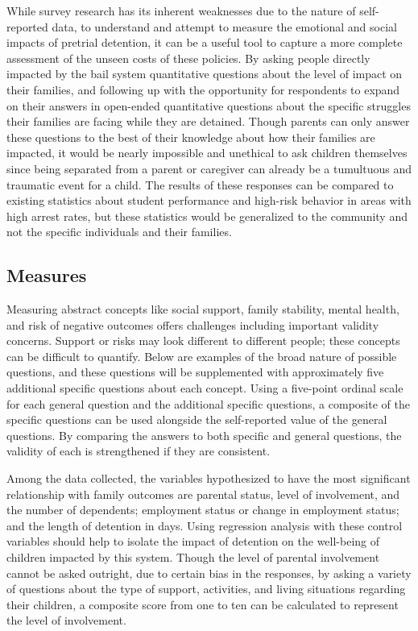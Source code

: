 \documentclass[
  letterpaper,
  DIV=11,
  numbers=noendperiod]{scrartcl}
\begin{document}
While survey research has its inherent weaknesses due to the nature of
self-reported data, to understand and attempt to measure the emotional
and social impacts of pretrial detention, it can be a useful tool to
capture a more complete assessment of the unseen costs of these
policies. By asking people directly impacted by the bail system
quantitative questions about the level of impact on their families, and
following up with the opportunity for respondents to expand on their
answers in open-ended quantitative questions about the specific
struggles their families are facing while they are detained. Though
parents can only answer these questions to the best of their knowledge
about how their families are impacted, it would be nearly impossible and
unethical to ask children themselves since being separated from a parent
or caregiver can already be a tumultuous and traumatic event for a
child. The results of these responses can be compared to existing
statistics about student performance and high-risk behavior in areas
with high arrest rates, but these statistics would be generalized to the
community and not the specific individuals and their families.

\hypertarget{measures}{%
\subsection{Measures}\label{measures}}

Measuring abstract concepts like social support, family stability,
mental health, and risk of negative outcomes offers challenges including
important validity concerns. Support or risks may look different to
different people; these concepts can be difficult to quantify. Below are
examples of the broad nature of possible questions, and these questions
will be supplemented with approximately five additional specific
questions about each concept. Using a five-point ordinal scale for each
general question and the additional specific questions, a composite of
the specific questions can be used alongside the self-reported value of
the general questions. By comparing the answers to both specific and
general questions, the validity of each is strengthened if they are
consistent.

Among the data collected, the variables hypothesized to have the most
significant relationship with family outcomes are parental status, level
of involvement, and the number of dependents; employment status or
change in employment status; and the length of detention in days. Using
regression analysis with these control variables should help to isolate
the impact of detention on the well-being of children impacted by this
system. Though the level of parental involvement cannot be asked
outright, due to certain bias in the responses, by asking a variety of
questions about the type of support, activities, and living situations
regarding their children, a composite score from one to ten can be
calculated to represent the level of involvement.
\end{document}
